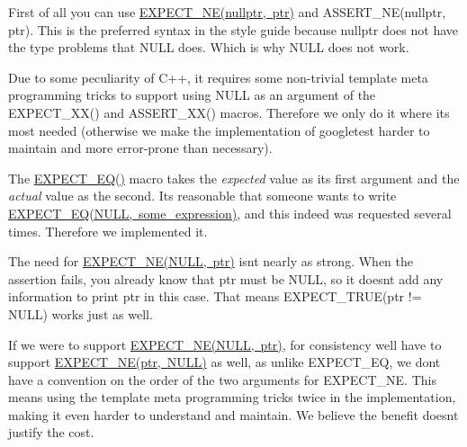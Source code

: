 First of all you can use {\ttfamily \mbox{\hyperlink{_obj__test_2lib_2googletest-release-1_88_81_2googletest_2include_2gtest_2gtest_8h_a6ae7443947f25abc58bfcfcfc56b0d75}{E\+X\+P\+E\+C\+T\+\_\+\+N\+E(nullptr, ptr)}}} and {\ttfamily A\+S\+S\+E\+R\+T\+\_\+\+NE(nullptr, ptr)}. This is the preferred syntax in the style guide because nullptr does not have the type problems that N\+U\+LL does. Which is why N\+U\+LL does not work.

Due to some peculiarity of C++, it requires some non-\/trivial template meta programming tricks to support using {\ttfamily N\+U\+LL} as an argument of the {\ttfamily E\+X\+P\+E\+C\+T\+\_\+\+X\+X()} and {\ttfamily A\+S\+S\+E\+R\+T\+\_\+\+X\+X()} macros. Therefore we only do it where it\textquotesingle{}s most needed (otherwise we make the implementation of googletest harder to maintain and more error-\/prone than necessary).

The {\ttfamily \mbox{\hyperlink{googletest-master_2googletest_2include_2gtest_2gtest_8h_a4159019abda84f5366acdb7604ff220a}{E\+X\+P\+E\+C\+T\+\_\+\+E\+Q()}}} macro takes the {\itshape expected} value as its first argument and the {\itshape actual} value as the second. It\textquotesingle{}s reasonable that someone wants to write {\ttfamily \mbox{\hyperlink{_obj__test_2lib_2googletest-release-1_88_81_2googletest_2include_2gtest_2gtest_8h_a4159019abda84f5366acdb7604ff220a}{E\+X\+P\+E\+C\+T\+\_\+\+E\+Q(\+N\+U\+L\+L, some\+\_\+expression)}}}, and this indeed was requested several times. Therefore we implemented it.

The need for {\ttfamily \mbox{\hyperlink{_obj__test_2lib_2googletest-release-1_88_81_2googletest_2include_2gtest_2gtest_8h_a6ae7443947f25abc58bfcfcfc56b0d75}{E\+X\+P\+E\+C\+T\+\_\+\+N\+E(\+N\+U\+L\+L, ptr)}}} isn\textquotesingle{}t nearly as strong. When the assertion fails, you already know that {\ttfamily ptr} must be {\ttfamily N\+U\+LL}, so it doesn\textquotesingle{}t add any information to print {\ttfamily ptr} in this case. That means {\ttfamily E\+X\+P\+E\+C\+T\+\_\+\+T\+R\+UE(ptr != N\+U\+LL)} works just as well.

If we were to support {\ttfamily \mbox{\hyperlink{_obj__test_2lib_2googletest-release-1_88_81_2googletest_2include_2gtest_2gtest_8h_a6ae7443947f25abc58bfcfcfc56b0d75}{E\+X\+P\+E\+C\+T\+\_\+\+N\+E(\+N\+U\+L\+L, ptr)}}}, for consistency we\textquotesingle{}ll have to support {\ttfamily \mbox{\hyperlink{_obj__test_2lib_2googletest-release-1_88_81_2googletest_2include_2gtest_2gtest_8h_a6ae7443947f25abc58bfcfcfc56b0d75}{E\+X\+P\+E\+C\+T\+\_\+\+N\+E(ptr, N\+U\+L\+L)}}} as well, as unlike {\ttfamily E\+X\+P\+E\+C\+T\+\_\+\+EQ}, we don\textquotesingle{}t have a convention on the order of the two arguments for {\ttfamily E\+X\+P\+E\+C\+T\+\_\+\+NE}. This means using the template meta programming tricks twice in the implementation, making it even harder to understand and maintain. We believe the benefit doesn\textquotesingle{}t justify the cost.

